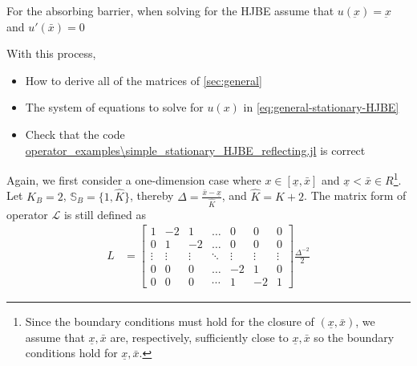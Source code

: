 \documentclass[11pt]{article}
\begin{document}
For the absorbing barrier, when solving for the HJBE assume that $u(\underbar{x}) = \underbar{x}$ and $u'(\bar{x}) = 0$


With this process,
\begin{itemize}
	\item How to derive all of the matrices of \cref{sec:general}
	\item The system of equations to solve for $u(x)$ in \cref{eq:general-stationary-HJBE}
	\item Check that the code \url{operator_examples\simple_stationary_HJBE_reflecting.jl} is correct
\end{itemize}

Again, we first consider a one-dimension case where $x\in [\underline{\textit{\~{x}}}, \bar{\textit{\~{x}}}]$ and $\underline{x} < \bar{x} \in R$\footnote{Since the boundary conditions must hold for the closure of $(\underline{x},\bar{x})$, we assume that $\underline{\textit{\~{x}}}, \bar{\textit{\~{x}}}$ are, respectively, sufficiently close to $\underline{x}, \bar{x}$ so the boundary conditions hold for $\underline{\textit{\~{x}}}, \bar{\textit{\~{x}}}$.}. Let $K_B = 2$, $\mathbb{S}_B = \{1,\hat{K}\}$, thereby $\Delta  = \frac{\bar{\textit{\~{x}}}-\underline{\textit{\~{x}}}}{\hat{K}}$, and $\hat{K} = K+2$. The matrix form of operator $\mathcal{L}$ is still defined as
\begin{align}
L &= \begin{bmatrix}
1&-2&1&\dots&0&0&0\\
0&1&-2&\dots&0&0&0\\
\vdots&\vdots&\vdots&\ddots&\vdots&\vdots&\vdots\\
0&0&0&\dots&-2&1&0\\
0&0&0&\cdots&1&-2&1
\end{bmatrix}\frac{\Delta^{-2}}{2}\nonumber
\end{align}
\end{document}
